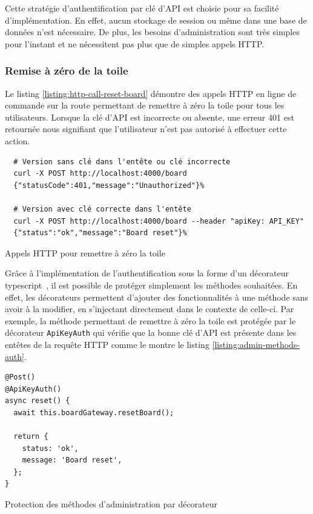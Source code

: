 Cette stratégie d'authentification par clé d'API est choisie pour sa facilité d'implémentation. En effet, aucun stockage de session ou même dans une base de données n'est nécessaire. De plus, les besoins d'administration sont très simples pour l'instant et ne nécessitent pas plus que de simples appels HTTP.

\subsubsection{Remise à zéro de la toile}

Le listing \ref{listing:http-call-reset-board} démontre des appels HTTP en ligne de commande sur la route permettant de remettre à zéro la toile pour tous les utilisateurs. Lorsque la clé d'API est incorrecte ou absente, une erreur 401 est retournée nous signifiant que l'utilisateur n'est pas autorisé à effectuer cette action.

\begin{listing}[h]
  \begin{verbatim}
  # Version sans clé dans l'entête ou clé incorrecte
  curl -X POST http://localhost:4000/board
  {"statusCode":401,"message":"Unauthorized"}%

  # Version avec clé correcte dans l'entête
  curl -X POST http://localhost:4000/board --header "apiKey: API_KEY"
  {"status":"ok","message":"Board reset"}%
\end{verbatim}
  \caption{Appels HTTP pour remettre à zéro la toile}
  \label{listing:http-call-reset-board}
\end{listing}

Grâce à l'implémentation de l'authentification sous la forme d'un décorateur \gls{typescript}~\cite{typescript-decorators}, il est possible de protéger simplement les méthodes souhaitées. En effet, les décorateurs permettent d'ajouter des fonctionnalités à une méthode sans avoir à la modifier, en s'injectant directement dans le contexte de celle-ci. Par exemple, la méthode permettant de remettre à zéro la toile est protégée par le décorateur \texttt{ApiKeyAuth} qui vérifie que la bonne clé d'API est présente dans les entêtes de la requête HTTP comme le montre le listing \ref{listing:admin-methods-auth}.

\begin{listing}[h]
  \begin{verbatim}
@Post()
@ApiKeyAuth()
async reset() {
  await this.boardGateway.resetBoard();

  return {
    status: 'ok',
    message: 'Board reset',
  };
}
\end{verbatim}
  \caption{Protection des méthodes d'administration par décorateur}
  \label{listing:admin-methods-auth}
\end{listing}

